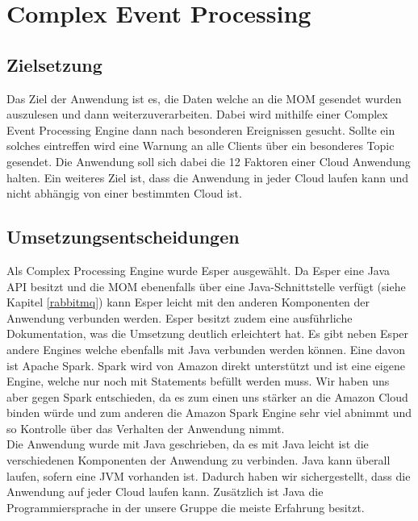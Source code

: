 \section{Complex Event Processing}\label{cep}


\subsection{Zielsetzung}
Das Ziel der Anwendung ist es, die Daten welche an die MOM gesendet wurden auszulesen und dann weiterzuverarbeiten. Dabei wird mithilfe einer Complex Event Processing Engine dann nach besonderen Ereignissen gesucht. Sollte ein solches eintreffen wird eine Warnung an alle Clients über ein besonderes Topic gesendet. Die Anwendung soll sich dabei die 12 Faktoren einer Cloud Anwendung halten. Ein weiteres Ziel ist, dass die Anwendung in jeder Cloud laufen kann und nicht abhängig von einer bestimmten Cloud ist. 

\subsection{Umsetzungsentscheidungen}
Als Complex Processing Engine wurde Esper ausgewählt. Da Esper eine Java API besitzt und die MOM ebenenfalls über eine Java-Schnittstelle verfügt (siehe Kapitel \ref{rabbitmq}) kann Esper leicht mit den anderen Komponenten der Anwendung verbunden werden. Esper besitzt zudem eine ausführliche Dokumentation, was die Umsetzung deutlich erleichtert hat. Es gibt neben Esper andere Engines welche ebenfalls mit Java verbunden werden können. Eine davon ist Apache Spark. Spark wird von Amazon direkt unterstützt und ist eine eigene Engine, welche nur noch mit Statements befüllt werden muss. Wir haben uns aber gegen Spark entschieden, da es zum einen uns stärker an die Amazon Cloud binden würde und zum anderen die Amazon Spark Engine sehr viel abnimmt und so Kontrolle über das Verhalten der Anwendung nimmt. 
\\
Die Anwendung wurde mit Java geschrieben, da es mit Java leicht ist die verschiedenen Komponenten der Anwendung zu verbinden. Java kann überall laufen, sofern eine JVM vorhanden ist. Dadurch haben wir sichergestellt, dass die Anwendung auf jeder Cloud laufen kann. Zusätzlich ist Java die Programmiersprache in der unsere Gruppe die meiste Erfahrung besitzt.   

